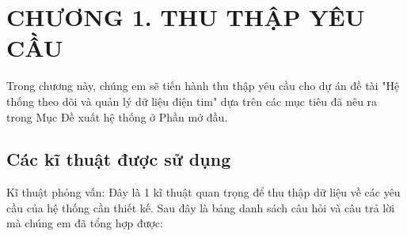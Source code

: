 
\section*{CHƯƠNG 1. THU THẬP YÊU CẦU}
\setcounter{section}{1}
\setcounter{subsection}{0} %
\setcounter{table}{0} %
\setcounter{figure}{0} %
Trong chương này, chúng em sẽ tiến hành thu thập yêu cầu cho dự án đề tài "Hệ thống theo dõi và quản lý dữ liệu điện tim" dựa trên các mục tiêu
đã nêu ra trong Mục Đề xuất hệ thống ở Phần mở đầu.

\subsection{Các kĩ thuật được sử dụng}
Kĩ thuật phỏng vấn: Đây là 1 kĩ thuật quan trọng để thu thập dữ liệu về các yêu cầu của hệ thống cần thiết kế. Sau đây là bảng danh sách câu hỏi và câu trả lời mà chúng em đã tổng hợp được:

